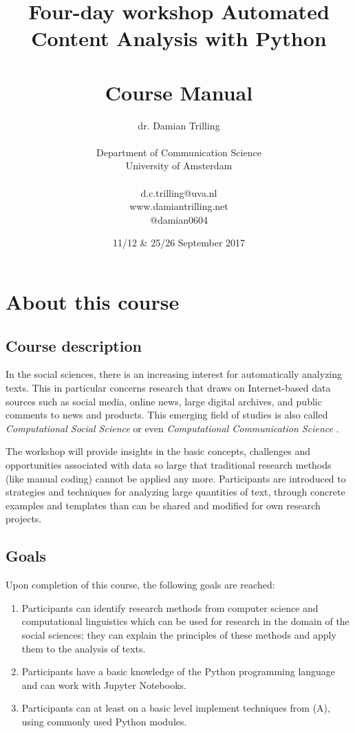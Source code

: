 \documentclass[a4paper,12pt]{report}
\title{Four-day workshop Automated Content Analysis with Python\\~\\Course Manual}
\author{dr. Damian Trilling\\~\\
Department of Communication Science
\\University of Amsterdam\\~\\d.c.trilling@uva.nl\\www.damiantrilling.net\\@damian0604\\}
\date{11/12 \& 25/26 September 2017}
\begin{document}
\maketitle



\section*{About this course}

\subsection*{Course description}
 
In the social sciences, there is an increasing interest for automatically analyzing texts. This in particular concerns research that draws on Internet-based data sources such as social media, online news, large digital archives, and public comments to news and products.  This emerging field of studies is also called \emph{Computational Social Science} \citep{Lazer2009} or even \emph{Computational Communication Science} \citep{Shah2015}.

The workshop will provide insights in the basic concepts, challenges and opportunities associated with data so large that traditional research methods (like manual coding) cannot be applied any more. Participants are introduced to strategies and techniques for analyzing large quantities of text, through concrete examples and templates than can be shared and modified for own research projects. 


\subsection*{Goals}
Upon completion of this course, the following goals are reached:
\begin{enumerate}[A]

\item Participants can identify research methods from computer science and computational linguistics which can be used for research in the domain of the social sciences; they can explain the principles of these methods and apply them to the analysis of texts.

\item Participants have a basic knowledge of the Python programming language and can work with Jupyter Notebooks.

\item Participants can at least on a basic level implement techniques from (A), using commonly used Python modules.

\end{enumerate}
\end{document}
